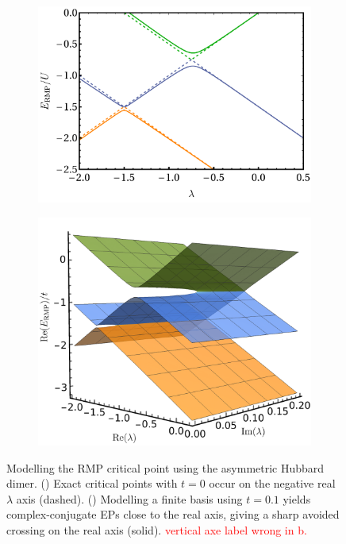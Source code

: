 \documentclass[aps,prb,reprint,noshowkeys,superscriptaddress]{revtex4-1}
\newcommand{\titou}[1]{\textcolor{red}{#1}}
\begin{document}
\begin{figure}[t]
	\begin{subfigure}{0.49\textwidth}
	\includegraphics[height=0.65\textwidth]{rmp_critical_point}
	\subcaption{\label{subfig:rmp_cp}}
    \end{subfigure}
	\begin{subfigure}{0.49\textwidth}
	\includegraphics[height=0.65\textwidth]{rmp_critical_point_surf}
	\subcaption{\label{subfig:rmp_cp_surf}}
    \end{subfigure}
	\caption{%
		Modelling the RMP critical point using the asymmetric Hubbard dimer.
		() Exact critical points with $t=0$ occur on the negative real $\lambda$ axis (dashed).
		() Modelling a finite basis using $t=0.1$ yields complex-conjugate EPs close to the
		real axis, giving a sharp avoided crossing on the real axis (solid).
		\titou{vertical axe label wrong in b.}
	\label{fig:RMP_cp}}
\end{figure}
\end{document}
